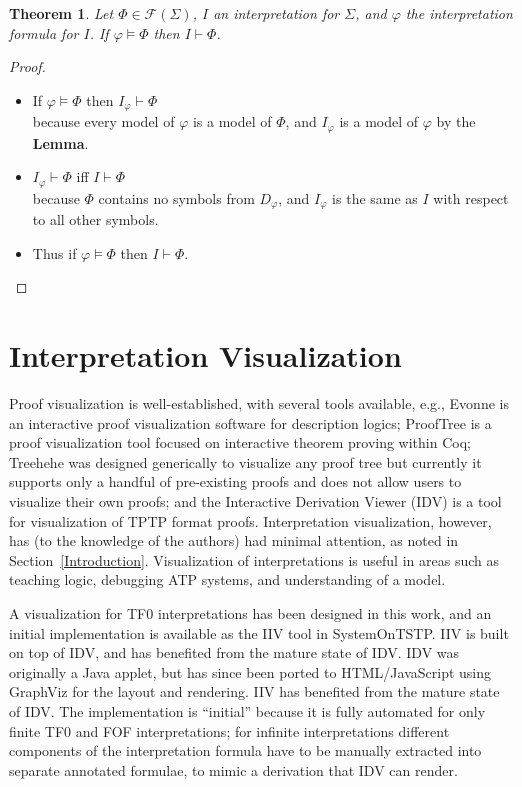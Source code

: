 \documentclass{easychair}
\newtheorem*{theorem}{Theorem}
\begin{document}
\begin{theorem}
Let $\Phi \in \mathcal{F}(\Sigma)$, $I$ an interpretation for $\Sigma$, and $\varphi$ the
interpretation formula for $I$.
If $\varphi \models \Phi$ then $I \vdash \Phi$.
\end{theorem}
\begin{proof}
~\linebreak
\vspace*{-1.5em}
\begin{itemize}
\item If $\varphi \models \Phi$ then $I_{\varphi} \vdash \Phi$ \\
      because every model of $\varphi$ is a model of $\Phi$, and $I_{\varphi}$ is a model
      of $\varphi$ by the {\bf Lemma}.
\item $I_{\varphi} \vdash \Phi$ iff $I \vdash \Phi$ \\
      because $\Phi$ contains no symbols from $D_{\varphi}$, and $I_{\varphi}$ is the same
      as $I$ with respect to all other symbols.
\item Thus if $\varphi \models \Phi$ then $I \vdash \Phi$.
\end{itemize}
\end{proof}

\section{Interpretation Visualization}
\label{Visualization}

Proof visualization is well-established, with several tools available, e.g., 
Evonne \cite{AB+22} is an interactive proof visualization software for description logics;
ProofTree \cite{Tew17} is a proof visualization tool focused on interactive theorem proving 
within Coq;
Treehehe \cite{Bat18} was designed generically to visualize any proof tree but currently it 
supports only a handful of pre-existing proofs and does not allow users to visualize their own 
proofs;
and the Interactive Derivation Viewer (IDV) \cite{TPS07} is a tool for visualization of 
TPTP format proofs.
Interpretation visualization, however, has (to the knowledge of the authors) had minimal 
attention, as noted in Section~\ref{Introduction}. 
Visualization of interpretations is useful in areas such as teaching logic, debugging ATP 
systems, and understanding of a model.

A visualization for TF0 interpretations has been designed in this work, and an initial
implementation is available as the IIV tool in SystemOnTSTP.
IIV is built on top of IDV, and has benefited from the mature state of IDV.
IDV was originally a Java applet, but has since been ported to HTML/JavaScript using GraphViz
\cite{EG+02} for the layout and rendering.
IIV has benefited from the mature state of IDV.
The implementation is ``initial'' because it is fully automated for only finite TF0 and FOF
interpretations; for infinite interpretations different components of the interpretation formula 
have to be manually extracted into separate annotated formulae, to mimic a derivation that IDV 
can render.
\end{document}
